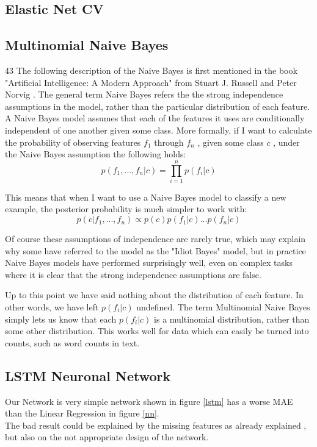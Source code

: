 \documentclass[journal]{IEEEtran}
\begin{document}
\subsection{Elastic Net CV}
\subsection{Multinomial Naive Bayes}
43
The following description of the Naive Bayes is first mentioned in the book "Artificial Intelligence: A Modern Approach" from Stuart J. Russell and Peter Norvig \cite{Russell}.
The general term Naive Bayes refers the the strong independence assumptions in the model, rather than the particular distribution of each feature. A Naive Bayes model assumes that each of the features it uses are conditionally independent of one another given some class. More formally, if I want to calculate the probability of observing features \(f_1\) through \(f_n\) , given some class \(c\) , under the Naive Bayes assumption the following holds:
\begin{equation}
p(f_1,..., f_n|c) = \prod_{i=1}^n p(f_i|c)
\end{equation}

This means that when I want to use a Naive Bayes model to classify a new example, the posterior probability is much simpler to work with:
\begin{equation}
p(c|f_1,...,f_n) \propto p(c)p(f_1|c)...p(f_n|c)
\end{equation}

Of course these assumptions of independence are rarely true, which may explain why some have referred to the model as the "Idiot Bayes" model, but in practice Naive Bayes models have performed surprisingly well, even on complex tasks where it is clear that the strong independence assumptions are false.

Up to this point we have said nothing about the distribution of each feature. In other words, we have left \(p(f_i|c)\) undefined. The term Multinomial Naive Bayes simply lets us know that each \(p(f_i|c)\) is a multinomial distribution, rather than some other distribution. This works well for data which can easily be turned into counts, such as word counts in text.
\subsection{LSTM Neuronal Network}

Our Network is very simple network shown in figure \ref{lstm} has a worse MAE than the Linear Regression in figure \ref{nn}. \\
The bad result could be explained by the missing features as already explained \cite{RN1}, but also on the not appropriate design of the network.
\end{document}
